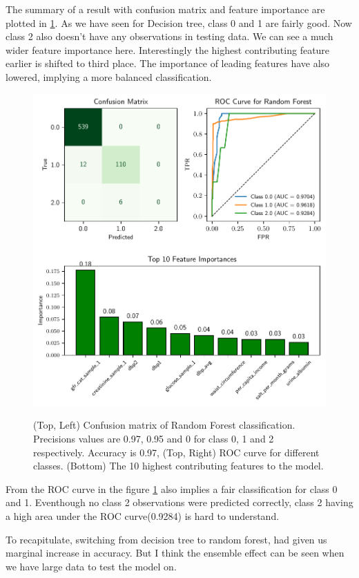 \documentclass{article}
\begin{document}
The summary of a result with confusion matrix and feature importance are plotted in \ref{fig:rfsum}. As we have seen for 
Decision tree, class 0 and 1 are fairly good. Now class 2 also doesn't have any observations in testing data. We can see 
a much wider feature importance here. Interestingly the highest contributing feature earlier is shifted to third place. 
The importance of leading features have also lowered, implying a more balanced classification.  

\begin{figure}\centering
    \includegraphics[scale=.75]{RF_summary.pdf}
    \label{fig:rfsum}
    \caption{(Top, Left) Confusion matrix of Random Forest classification. Precisions values are 
    0.97, 0.95 and 0 for class 0, 1 and 2 respectively. Accuracy is 0.97, (Top, Right) ROC curve for different
    classes. (Bottom) The 10 highest contributing features
    to the model.}
\end{figure}
From the ROC curve in the figure \ref{fig:rfsum} also implies a fair classification for 
class 0 and 1. Eventhough no class 2 observations were predicted correctly, class 2 having 
a high area under the ROC curve(0.9284) is hard to understand. 

To recapitulate, switching from decision tree to random forest, had given us marginal increase
in accuracy. But I think the ensemble effect can be seen when we have large data to test the model on. 
\end{document}
